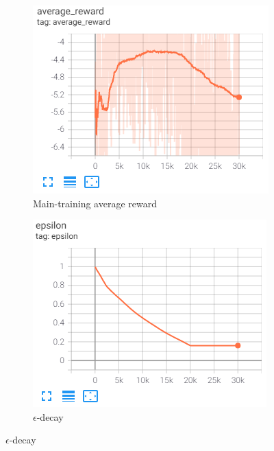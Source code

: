 \begin{figure}[ht]
	\centering
	\begin{subfigure}[b]{0.49\textwidth}
		\centering
		\includegraphics[width=\textwidth]{figures/training4-main-reward-smooth.PNG}
		\caption{Main-training average reward}
		\label{fig:main-reward-smoothed-4}
	\end{subfigure}
	\hfill
	\begin{subfigure}[b]{0.49\textwidth}
		\centering
		\includegraphics[width=\textwidth]{figures/training4-epsilon.PNG}
		\caption{$\epsilon$-decay}
		\label{fig:epsilon-4}
	\end{subfigure}
\end{figure}

